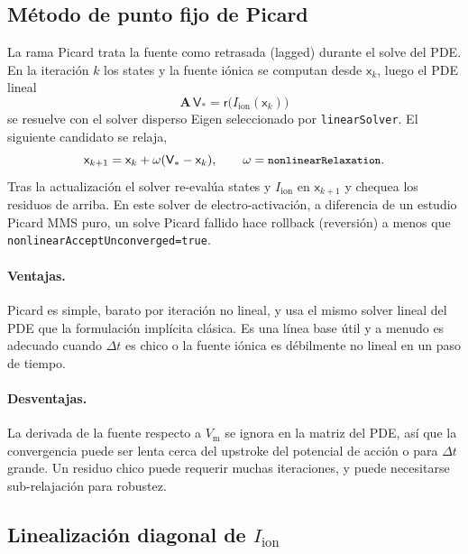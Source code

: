 \documentclass[11pt,a4paper]{article}
\newcommand{\code}[1]{\texttt{\small #1}}
\newcommand{\Vm}{V_{\text{m}}}
\newcommand{\Iion}{I_{\mathrm{ion}}}
\newcommand{\Aimp}{\mathbf{A}}
\begin{document}
\subsection{Método de punto fijo de Picard}

La rama Picard trata la fuente como retrasada (lagged) durante el solve del PDE. En
la iteración $k$ los states y la fuente iónica se computan desde $\mathsf{x}_k$,
luego el PDE lineal
\begin{equation}
  \Aimp\,\mathsf{V}_{*}
  =
  \mathsf{r}\!\bigl(\Iion(\mathsf{x}_{k})\bigr)
\end{equation}
se resuelve con el solver disperso Eigen seleccionado por \code{linearSolver}. El
siguiente candidato se relaja,
\begin{equation}
  \mathsf{x}_{k+1}
  =
  \mathsf{x}_{k}
  + \omega(\mathsf{V}_{*}-\mathsf{x}_{k}),
  \qquad
  \omega=\code{nonlinearRelaxation}.
\end{equation}
Tras la actualización el solver re-evalúa states y $\Iion$ en $\mathsf{x}_{k+1}$ y
chequea los residuos de arriba. En este solver de electro-activación, a diferencia
de un estudio Picard MMS puro, un solve Picard fallido hace rollback (reversión) a
menos que \code{nonlinearAcceptUnconverged=true}.

\paragraph{Ventajas.}
Picard es simple, barato por iteración no lineal, y usa el mismo solver lineal del
PDE que la formulación implícita clásica. Es una línea base útil y a menudo es
adecuado cuando $\Delta t$ es chico o la fuente iónica es débilmente no lineal en un
paso de tiempo.

\paragraph{Desventajas.}
La derivada de la fuente respecto a $\Vm$ se ignora en la matriz del PDE, así que la
convergencia puede ser lenta cerca del upstroke del potencial de acción o para
$\Delta t$ grande. Un residuo chico puede requerir muchas iteraciones, y puede
necesitarse sub-relajación para robustez.

\subsection{Linealización diagonal de \texorpdfstring{$\Iion$}{Iion}}
\end{document}
